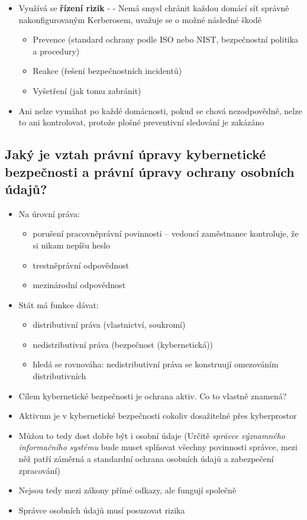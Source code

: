\begin{itemize}
    \item Využívá se \textbf{řízení rizik} -  - Nemá smysl chránit každou domácí síť správně nakonfigurovaným Kerberosem, uvažuje se o možné následné škodě
    \begin{itemize}
        \item Prevence (standard ochrany podle ISO nebo NIST, bezpečnostní politika a procedury)
        \item Reakce (řešení bezpečnostních incidentů)
        \item Vyšetření (jak tomu zabránit)
    \end{itemize}
    \item Ani nelze vymáhat po každé domácnosti, pokud se chová nezodpovědně, nelze to ani kontrolovat, protože plošné preventivní sledování je zakázáno
\end{itemize}


\subsection{ Jaký je vztah právní úpravy kybernetické bezpečnosti a právní úpravy ochrany osobních údajů?}
\begin{itemize}
    \item Na úrovní práva:
          \begin{itemize}
              \item  porušení pracovněprávní povinnosti – vedoucí zaměstnanec kontroluje, že si nikam nepíšu heslo
              \item trestněprávní odpovědnost
              \item mezinárodní odpovědnost
          \end{itemize}
    \item Stát má funkce dávat:
          \begin{itemize}
              \item distributivní práva (vlastnictví, soukromí)
              \item nedistributivní práva (bezpečnost (kybernetická))
              \item hledá se rovnováha: nedistributivní práva se konstruují omezováním distributivních
          \end{itemize}
    \item Cílem kybernetické bezpečnosti je ochrana aktiv. Co to vlastně znamená?
    \item Aktivum je v kybernetické bezpečnosti cokoliv dosažitelné přes kyberprostor
    \item Můžou to tedy dost dobře být i osobní údaje (Určitě \textit{správce významného informačního systému} bude muset splňovat všechny povinnosti správce, mezi něž patří záměrná a standardní ochrana osobních údajů a zabezpečení zpracování)
    \item Nejsou tedy mezi zákony přímé odkazy, ale fungují společně
    \item Správce osobních údajů musí posuzovat rizika
\end{itemize}


